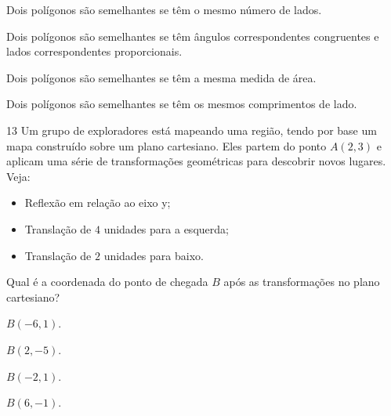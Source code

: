\begin{escolha}
\item Dois polígonos são semelhantes se têm o mesmo número de lados.

\item Dois polígonos são semelhantes se têm ângulos correspondentes congruentes e lados correspondentes proporcionais.

\item Dois polígonos são semelhantes se têm a mesma medida de área.

\item Dois polígonos são semelhantes se têm os mesmos comprimentos de lado.
\end{escolha}



\num{13} Um grupo de exploradores está mapeando uma região, tendo por base
um mapa construído sobre um plano cartesiano. Eles partem do ponto $A(2,3)$
e aplicam uma série de transformações geométricas para descobrir novos lugares.
Veja:

\begin{itemize}
\item Reflexão em relação ao eixo y;
\item Translação de $4$ unidades para a esquerda;
\item Translação de $2$ unidades para baixo.
\end{itemize}

Qual é a coordenada do ponto de chegada $B$ após as transformações no plano cartesiano?

\begin{escolha}
\item $B(-6,1)$.

\item $B(2,-5)$.

\item $B(-2,1)$.

\item $B(6,-1)$.
\end{escolha}

